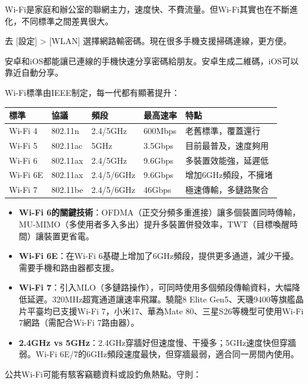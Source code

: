 Wi-Fi是家庭和辦公室的聯網主力，速度快、不費流量。但Wi-Fi其實也在不斷進化，不同標準之間差異很大。


去 [設定] > [WLAN] 選擇網路輸密碼。現在很多手機支援掃碼連線，更方便。


安卓和iOS都能讓已連線的手機快速分享密碼給朋友。安卓生成二維碼，iOS可以靠近自動分享。


Wi-Fi標準由IEEE制定，每一代都有顯著提升：

\begin{center}
\begin{tabularx}{\linewidth}{|X|X|X|X|X|}
\hline
\textbf{標準} & \textbf{協議} & \textbf{頻段} & \textbf{最高速率} & \textbf{特點} \tabularnewline
\hline
Wi-Fi 4 & 802.11n & 2.4/5GHz & 600Mbps & 老舊標準，覆蓋還行 \tabularnewline
Wi-Fi 5 & 802.11ac & 5GHz & 3.5Gbps & 目前最普及，速度夠用 \tabularnewline
Wi-Fi 6 & 802.11ax & 2.4/5GHz & 9.6Gbps & 多裝置效能強，延遲低 \tabularnewline
Wi-Fi 6E & 802.11ax & 2.4/5/6GHz & 9.6Gbps & 增加6GHz頻段，不擁堵 \tabularnewline
Wi-Fi 7 & 802.11be & 2.4/5/6GHz & 46Gbps & 極速傳輸，多鏈路聚合 \tabularnewline
\hline
\end{tabularx}
\end{center}

\begin{itemize}
  \item \textbf{Wi-Fi 6的關鍵技術}：OFDMA（正交分頻多重進接）讓多個裝置同時傳輸，MU-MIMO（多使用者多入多出）提升多裝置併發效率，TWT（目標喚醒時間）讓裝置更省電。
  \item \textbf{Wi-Fi 6E}：在Wi-Fi 6基礎上增加了6GHz頻段，提供更多通道，減少干擾。需要手機和路由器都支援。
  \item \textbf{Wi-Fi 7}：引入MLO（多鏈路操作），可同時使用多個頻段傳輸資料，大幅降低延遲。320MHz超寬通道讓速率飛躍。驍龍8 Elite Gen5、天璣9400等旗艦晶片平臺均已支援Wi-Fi 7，小米17、華為Mate 80、三星S26等機型可使用Wi-Fi 7網路（需配合Wi-Fi 7路由器）。
  \item \textbf{2.4GHz vs 5GHz}：2.4GHz穿牆好但速度慢、干擾多；5GHz速度快但穿牆弱。Wi-Fi 6E/7的6GHz頻段速度最快，但穿牆最弱，適合同一房間內使用。
\end{itemize}


公共Wi-Fi可能有駭客竊聽資料或設釣魚熱點。守則：

